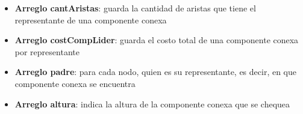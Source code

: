 \begin{itemize}

\item {\bf Arreglo cantAristas}: guarda la cantidad de aristas que tiene el representante de una componente conexa
\item {\bf Arreglo costCompLider}: guarda el costo total de una componente conexa por representante 
\item {\bf Arreglo padre}: para cada nodo, quien es su representante, es decir, en que componente conexa se encuentra
\item {\bf Arreglo altura}: indica la altura de la componente conexa que se chequea
\end{itemize}  